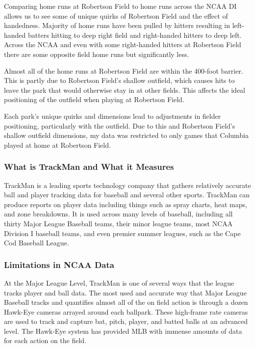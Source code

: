 \documentclass{article}
\begin{document}
Comparing home runs at Robertson Field to home runs across the NCAA DI allows us to see some of unique quirks of Robertson Field and the effect of handedness. Majority of home runs have been pulled by hitters resulting in left-handed batters hitting to deep right field and right-handed hitters to deep left. Across the NCAA and even with some right-handed hitters at Robertson Field there are some opposite field home runs but significantly less. 

Almost all of the home runs at Robertson Field are within the 400-foot barrier. This is partly due to Robertson Field's shallow outfield, which causes hits to leave the park that would otherwise stay in at other fields. This affects the ideal positioning of the outfield when playing at Robertson Field.

Each park's unique quirks and dimensions lead to adjustments in fielder positioning, particularly with the outfield. Due to this and Robertson Field's shallow outfield dimensions, my data was restricted to only games that Columbia played at home at Robertson Field.
\vspace{1cm}

\subsubsection{What is TrackMan and What it Measures}
TrackMan is a leading sports technology company that gathers relatively accurate ball and player tracking data for baseball and several other sports. TrackMan can produce reports on player data including things such as spray charts, heat maps, and zone breakdowns. It is used across many levels of baseball, including all thirty Major League Baseball teams, their minor league teams, most NCAA Division I baseball teams, and even premier summer leagues, such as the Cape Cod Baseball League. \cite{trackman2023baseball}


\subsubsection{Limitations in NCAA Data}
At the Major League Level, TrackMan is one of several ways that the league tracks player and ball data. The most used and accurate way that Major League Baseball tracks and quantifies almost all of the on field action is through a dozen Hawk-Eye cameras arrayed around each ballpark. These high-frame rate cameras are used to track and capture bat, pitch, player, and batted balls at an advanced level. The Hawk-Eye system has provided MLB with immense amounts of data for each action on the field. \cite{dawn2023hawkeye}
\end{document}
